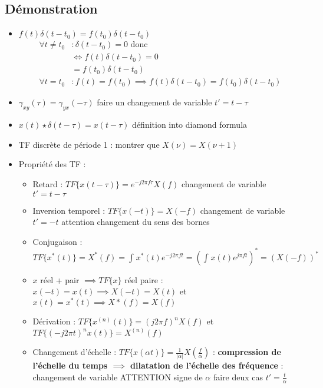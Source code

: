 \documentclass{article}
\begin{document}
\begin{multicols}{2}
    \section{Démonstration}
    \begin{itemize}
        \item $ f(t) \delta(t - t_0) = f(t_0)\delta (t- t_0) $ 
        \begin{align*}
            \forall t \neq t_0 &: \delta (t - t_0) = 0 \text{ donc}\\
            &\Leftrightarrow f(t) \delta (t - t_0) = 0 \\
            &= f(t_0)\delta (t - t_0) \\
            \forall t = t_0 &: f(t) = f(t_0) \implies f(t) \delta (t - t_0) = f(t_0) \delta (t - t_0)
        \end{align*}
        \item $ \gamma _{xy} (\tau ) = \gamma _{yx} (-\tau ) $ faire un changement de variable $ t' = t - \tau  $ 
        \item $ x(t) \star \delta (t - \tau ) = x(t - \tau )$ définition into diamond formula 
        \item TF discrète de période 1 : montrer que $ X(\nu ) = X(\nu +1) $ 
        \item Propriété des TF : \begin{itemize}
            \item Retard : $ TF\{x(t - \tau )\} = e^{- j 2 \pi f \tau }X(f) $ changement de variable $ t' = t - \tau  $ 
            \item Inversion temporel : $ TF \{x(-t)\} = X(-f) $ changement de variable $ t' = - t  $ attention changement du sens des bornes
            \item Conjugaison : $ TF\{x^*(t)\} = X^*(f) = \int_{}^{}x^*(t) e^{-j 2 \pi ft} = (\int_{}^{}x(t) e^{j \pi ft})^* = (X(-f))^* $ 
            \item $ x $ réel + pair $ \implies TF\{x\} $ réel paire : $ x(-t) = x(t) \implies X(-t) = X(t) $ et $ x(t) = x^*(t) \implies X*(f) = X(f) $   
            \item Dérivation : $ TF\{x^{(n)}(t)\} = (j2 \pi f)^n X(f)$ et $ TF\{(-j2 \pi t)^n x(t)\} = X^{(n)}(f) $  
            \item Changement d'échelle : $ TF\{x(\alpha t)\} = \frac{1}{\left| \alpha  \right| }X(\frac{f}{\alpha }) $ : \textbf{compression de l'échelle du temps $ \implies  $ dilatation de l'échelle des fréquence} : changement de variable ATTENTION signe de $ \alpha  $ faire deux cas $ t' = \frac{t}{\alpha } $ 

\end{itemize}
\end{itemize}
\end{multicols}
\end{document}
